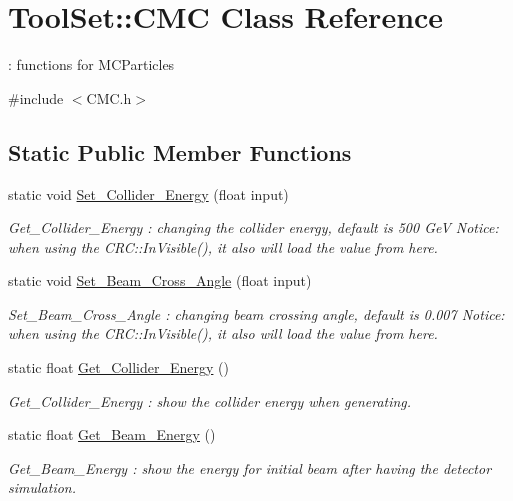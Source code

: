 \hypertarget{classToolSet_1_1CMC}{
\section{ToolSet::CMC Class Reference}
\label{classToolSet_1_1CMC}
}


: functions for MCParticles  


{\ttfamily \#include $<$CMC.h$>$}\subsection*{Static Public Member Functions}
\begin{DoxyCompactItemize}
\item 
static void \hyperlink{classToolSet_1_1CMC_a2b939b1fd1e396eb5764c512903fe229}{Set\_\-Collider\_\-Energy} (float input)
\begin{DoxyCompactList}\small\item\em Get\_\-Collider\_\-Energy : changing the collider energy, default is 500 GeV Notice: when using the CRC::InVisible(), it also will load the value from here. \item\end{DoxyCompactList}\item 
static void \hyperlink{classToolSet_1_1CMC_a6d72918adb583b9dcaee3c0c9166f6cb}{Set\_\-Beam\_\-Cross\_\-Angle} (float input)
\begin{DoxyCompactList}\small\item\em Set\_\-Beam\_\-Cross\_\-Angle : changing beam crossing angle, default is 0.007 Notice: when using the CRC::InVisible(), it also will load the value from here. \item\end{DoxyCompactList}\item 
static float \hyperlink{classToolSet_1_1CMC_a7143149e3db8c1e5055498c8aba88182}{Get\_\-Collider\_\-Energy} ()
\begin{DoxyCompactList}\small\item\em Get\_\-Collider\_\-Energy : show the collider energy when generating. \item\end{DoxyCompactList}\item 
static float \hyperlink{classToolSet_1_1CMC_afaf6f983eee33318bcaf7923cde7266e}{Get\_\-Beam\_\-Energy} ()
\begin{DoxyCompactList}\small\item\em Get\_\-Beam\_\-Energy : show the energy for initial beam after having the detector simulation. \item\end{DoxyCompactList}\item 

\end{DoxyCompactItemize}
